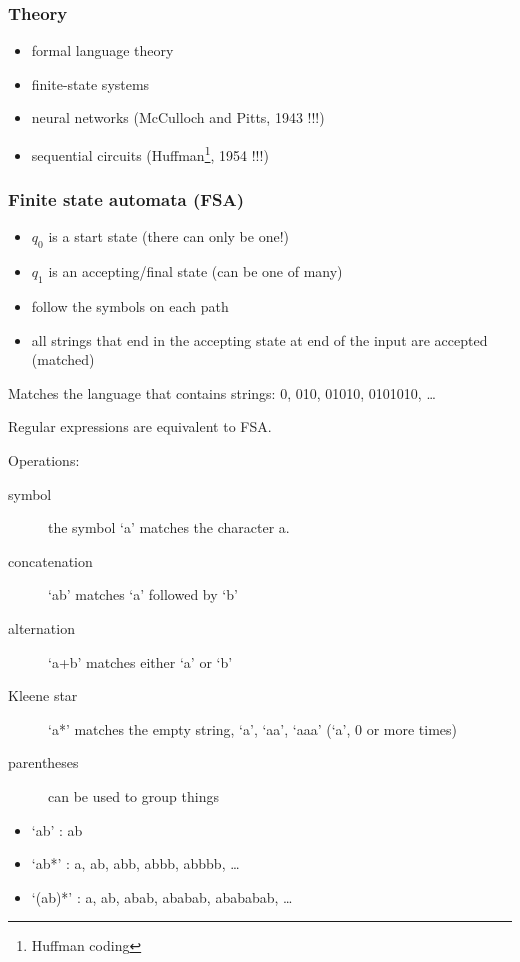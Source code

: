 \documentclass[%
        hyperref={%
                pdfauthor={Zakariyya Mughal},%
                pdfpagemode={None},pdfpagelayout={SinglePage}}%
        xcolor={x11names},%
]{beamer}
\begin{document}
\begin{frame}
\frametitle{Theory}
\begin{itemize}
	\item[] formal language theory
		\pause
	\item[] finite-state systems
	\item[] \quad neural networks (McCulloch and Pitts, 1943 !!!)
	\item[] \quad sequential circuits (Huffman\footnote{Huffman coding}, 1954 !!!)
\end{itemize}
\end{frame}

\begin{frame}
\frametitle{Finite state automata (FSA)}
\centering\resizebox{0.8\textwidth}{!}{ 
	
}

\begin{itemize}
	\item \(q_0\) is a start state (there can only be one!)
	\pause\item \(q_1\) is an accepting/final state (can be one of many)
	\pause\item follow the symbols on each path
	\pause\item all strings that end in the accepting state at end
		of the input are accepted (matched)
\end{itemize}
\pause

Matches the language that contains strings: 0, 010, 01010,
0101010, \ldots

\end{frame}

\begin{frame}
	Regular expressions are equivalent to FSA.

	Operations:
	\begin{description}
		\item [symbol] the symbol `a' matches the
			character a.
		\pause
		\item [concatenation] `ab' matches `a' followed by
			`b'
		\pause
		\item [alternation] `a+b' matches either `a' or `b'
		\pause
		\item [Kleene star] `a*' matches the empty string,
			`a', `aa', `aaa' (`a', 0 or more times)
		\pause
		\item [parentheses] can be used to group things
	\end{description}
\end{frame}

\begin{frame}
	\begin{itemize}
		\item `ab' : ab
		\pause
		\item `ab*' : a, ab, abb, abbb, abbbb, \ldots
		\pause
		\item `(ab)*' : a, ab, abab, ababab, abababab, \ldots
	\end{itemize}
\end{frame}
\end{document}
